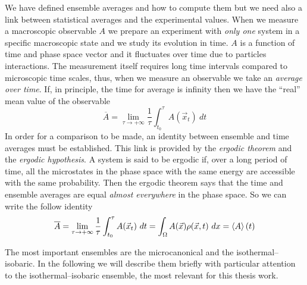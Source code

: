We have defined ensemble averages and how to compute them but we need also a link between statistical averages and the experimental values. When we measure a macroscopic observable $A$ we prepare an experiment with \textit{only one} system in a specific macroscopic state and we study its evolution in time. $A$ is a function of time and phase space vector and it fluctuates over time due to particles interactions. The measurement itself requires long time intervals compared to microscopic time scales, thus, when we measure an observable we take an \textit{average over time}.
If, in principle, the time for average is infinity then we have the ``real'' mean value of the observable
\begin{equation*}
	\overline{A} = \lim_{\tau\to +\infty}\frac{1}{\tau}\int_{t_0}^\tau A(\vec x_t)\ dt
	\label{eq:timeAve}
\end{equation*}
In order for a comparison to be made, an identity between ensemble and time averages must be established.
This link is provided by the \textit{ergodic theorem} and the \textit{ergodic hypothesis}. A system is said to be ergodic if, over a long period of time, all the microstates in the phase space with the same energy are accessible with the same probability. Then the ergodic theorem says that the time and ensemble averages are equal \textit{almost everywhere} in the phase space. So we can write the follow identity
\begin{equation*}
	\overline{A} = \lim_{\tau\to +\infty}\frac{1}{\tau}\int_{t_0}^\tau A(\vec x_t)\ dt = \int_\Omega A(\vec x)\rho(\vec x, t)\ dx = \left \langle A \right \rangle(t)
\end{equation*}

The most important ensembles are the microcanonical and the isothermal--isobaric. In the following we will describe them briefly with particular attention to the isothermal--isobaric ensemble, the most relevant for this thesis work.

